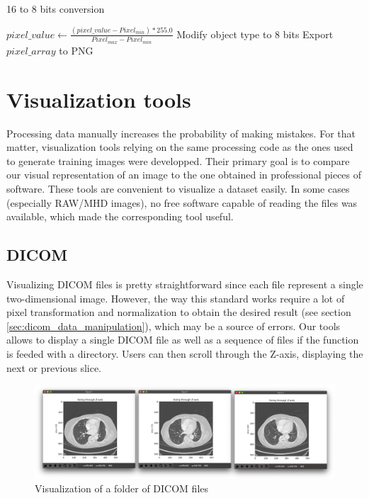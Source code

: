 \begin{algorithm}
    \caption{16 to 8 bits conversion}
    \label{alg:16_to_8_bits_conversion}
    \begin{algorithmic}[1] %
        			\State $pixel\_value \gets \frac{(pixel\_value - Pixel_{min}) * 255.0}{Pixel_{max} - Pixel_{min}}$
        		\EndFor
        		\State Modify object type to 8 bits
        		\State Export $pixel\_array$ to PNG
        \EndProcedure
    \end{algorithmic}
\end{algorithm}


\section{Visualization tools}
Processing data manually increases the probability of making mistakes. For that matter, visualization tools relying on the same processing code as the ones used to generate training images were developped. Their primary goal is to compare our visual representation of an image to the one obtained in professional pieces of software. These tools are convenient to visualize a dataset easily. In some cases (especially RAW/MHD images), no free software capable of reading the files was available, which made the corresponding tool useful. 


\subsection{DICOM}
Visualizing DICOM files is pretty straightforward since each file represent a single two-dimensional image. However, the way this standard works require a lot of pixel transformation and normalization to obtain the desired result (see section \ref{sec:dicom_data_manipulation}), which may be a source of errors. Our tools allows to display a single DICOM file as well as a sequence of files if the function is feeded with a directory. Users can then scroll through the Z-axis, displaying the next or previous slice. 

\begin{figure}[!h]
\centering
\includegraphics[width=\textwidth, keepaspectratio=true]{./figures/visualize_lung_dcm.png}
\caption{Visualization of a folder of DICOM files}
\label{fig:visualize_lung_dcm}
\end{figure}


